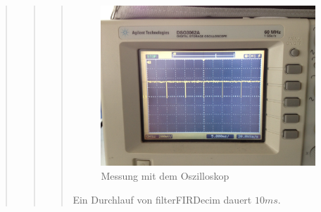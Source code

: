 \begin{quote}
\begin{quote}
\begin{quote}
            \begin{figure}[H]
            \centering
                \includegraphics[scale=0.2, trim = 0cm 0cm 0cm 0cm, clip]{./Bilder/Foto.jpg}
                    \caption{Messung mit dem Oszilloskop}
            \end{figure}
        
            Ein Durchlauf von filterFIRDecim dauert $10ms$.
            
		\end{quote} %
        
    \end{quote}  %
\end{quote} %



